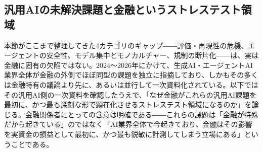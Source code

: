 \subsection{汎用AIの未解決課題と金融というストレステスト領域}
\label{sec:cross-domain-gaps}

本節がここまで整理してきた4カテゴリのギャップ――評価・再現性の危機、エージェントの安全性、モデル集中とモノカルチャー、規制の断片化――は、実は金融に固有の欠陥ではない。2024〜2026年にかけて、生成AI・エージェントAI業界全体が金融の外側でほぼ同型の課題を独立に指摘しており、しかもその多くは金融特有の議論より先に、あるいは並行して一次資料化されている。以下ではその汎用AI側の一次資料を確認したうえで、「なぜ金融がこれらの汎用AI課題を最初に、かつ最も深刻な形で顕在化させるストレステスト領域になるのか」を論じる。金融関係者にとっての含意は明確である――これらの課題は「金融が特殊だから起きている」のではなく「AI業界全体で今起きており、金融はその影響を実資金の損益として最初に、かつ最も鋭敏に計測してしまう立場にある」ということである。

